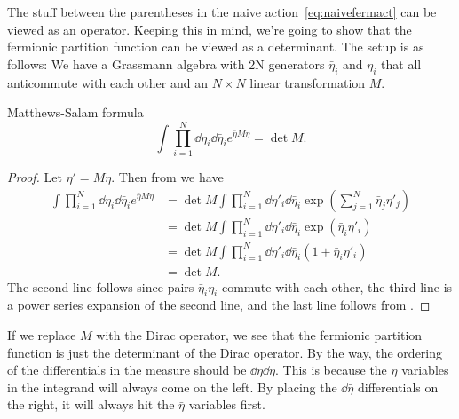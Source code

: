 The stuff between the parentheses in the naive action~\eqref{eq:naivefermact}
can be viewed as an operator. Keeping this in mind, we're going to show
that the fermionic partition function can be viewed as a determinant.
The setup is as follows: We have a Grassmann algebra with 2N generators
$\bar{\eta}_i$ and $\eta_i$ that all anticommute with each other and
an $N\times N$ linear transformation $M$.
\begin{theorem}{Matthews-Salam formula}{}
$$
  \int\prod_{i=1}^N\dd{\eta_i}\dd{\bar{\eta}_i}e^{\bar{\eta}M\eta}=\det M.
$$
\begin{proof} Let $\eta'=M\eta$. Then from 
  we have
  \begin{equation*}\begin{aligned}
  \int \prod_{i=1}^N\dd{\eta_i}\dd{\bar{\eta}_i}e^{\bar{\eta}M\eta}
    &=\det M\int \prod_{i=1}^N\dd{\eta'_i}\dd{\bar{\eta}_i}
       \exp\left(\sum_{j=1}^N\bar{\eta}_j\eta'_j\right)\\
    &=\det M\int \prod_{i=1}^N\dd{\eta'_i}\dd{\bar{\eta}_i}
       \exp\left(\bar{\eta}_i\eta'_i\right)\\
    &=\det M\int \prod_{i=1}^N\dd{\eta'_i}\dd{\bar{\eta}_i}
        (1+\bar{\eta}_i\eta'_i)\\
    &=\det M.
  \end{aligned}\end{equation*}
  The second line follows since pairs $\bar{\eta}_i\eta_i$ commute with
  each other, the third line is a power series expansion of the second
  line, and the last line follows from .
\end{proof}
\end{theorem}
If we replace $M$ with the Dirac operator, we see that the fermionic
partition function is just the determinant of the Dirac operator.
By the way, the ordering of the differentials in the measure should
be $\dd{\eta}\dd{\bar{\eta}}$. This is because the $\bar{\eta}$ variables
in the integrand will always come on the left. By placing the
$\dd{\bar{\eta}}$ differentials on the right, it will always hit the
$\bar{\eta}$ variables first.

